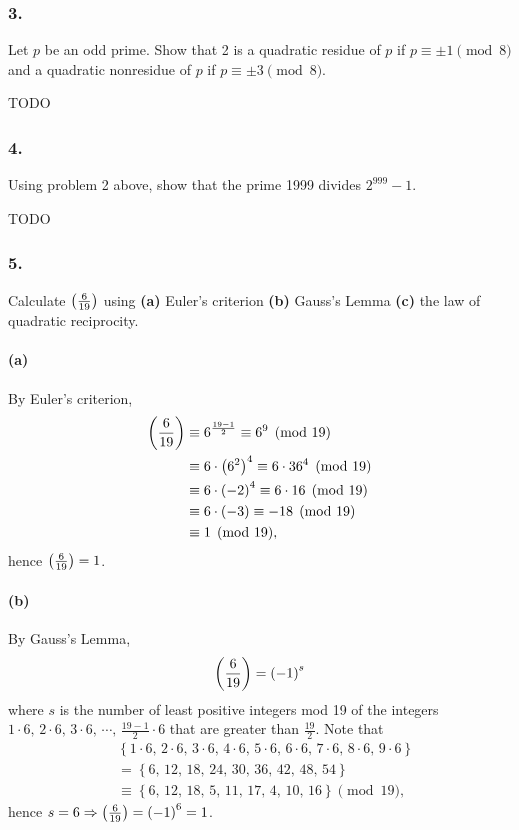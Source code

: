 \subsubsection{3.} Let $p$ be an odd prime. Show that 2 is a quadratic residue
of $p$ if $p \equiv \pm 1 \pmod{8}$ and a quadratic nonresidue of $p$ if
$p \equiv \pm 3 \pmod{8}$.

{\Large TODO}

\subsubsection{4.} Using problem 2 above, show that the prime 1999
divides $2^{999}-1$.

{\Large TODO}

\subsubsection{5.} Calculate $\left(\frac{6}{19}\right)$ using \textbf{(a)} Euler's
criterion \textbf{(b)} Gauss's Lemma \textbf{(c)} the law of quadratic
reciprocity.

\paragraph{(a)} By Euler's criterion,
\begin{align*}
    \left(\frac{6}{19}\right) & \equiv 6^{\frac{19-1}{2}} \equiv 6^9 \pmod{19} \\
    &\equiv 6 \cdot \left(6^2\right)^4 \equiv 6 \cdot 36^4 \pmod{19} \\
    &\equiv 6 \cdot \left(-2\right)^4 \equiv 6 \cdot 16 \pmod{19} \\
    &\equiv 6 \cdot \left(-3\right) \equiv -18 \pmod{19} \\
    &\equiv 1 \pmod{19},
\end{align*}
hence $\left(\frac{6}{19}\right)=1$.

\paragraph{(b)} By Gauss's Lemma,
\[
    \left(\frac{6}{19}\right) = \left(-1\right)^s
\]
where $s$ is the number of least positive integers mod 19 of the
integers $1\cdot 6,\,2\cdot 6,\,3\cdot 6,\,\cdots,\,\frac{19-1}{2}\cdot 6$
that are greater than $\frac{19}{2}$.
Note that
\begin{align*}
    & \left\{ 1\cdot 6,\,2\cdot 6,\,3\cdot 6,\,4\cdot 6,\,
    5\cdot 6,\,6\cdot 6,\,7\cdot 6,\,8\cdot 6,\,9\cdot 6\right\} \\
    &= \left\{ 6,\,12,\,18,\,24,\,30,\,36,\,42,\,48,\,54\right\} \\
    &\equiv \left\{ 6,\,12,\,18,\,5,\,11,\,17,\,4,\,10,\,16 \right\} \pmod{19},
\end{align*}
hence $s=6 \Rightarrow \left(\frac{6}{19}\right)=\left(-1\right)^6=1$.

